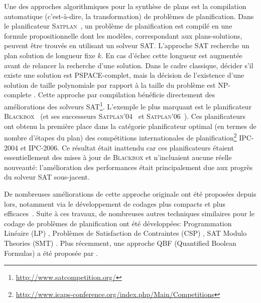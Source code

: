 Une des approches algorithmiques pour la synthèse de plans est la compilation automatique (c'est-à-dire, la transformation) de problèmes de planification. Dans le planificateur \textsc{Satplan}~\cite{KS92}, un problème de planification est compilé en une formule propositionnelle dont les modèles, correspondant aux plans-solutions, peuvent être trouvés en utilisant un solveur SAT.
L'approche SAT recherche un plan solution de longueur fixe $k$. En cas d'échec cette longueur est augmentée avant de relancer la recherche d'une solution. Dans le cadre classique, décider s'il existe une solution est PSPACE-complet, mais la décision de l'existence d'une solution de taille polynomiale par rapport à la taille du problème est NP-complete \cite{DBLP:journals/ai/Bylander94}.
Cette approche par compilation bénéficie directement des améliorations des solveurs SAT\footnote{\url{http://www.satcompetition.org/}}. L'exemple le plus marquant est le planificateur \textsc{Blackbox}~\cite{KS98a,KS99} (et ses successeurs \textsc{Satplan}'04~\cite{KAU04} et \textsc{Satplan}'06~\cite{KSH06}). Ces planificateurs ont obtenu la première place dans la catégorie planificateur optimal (en termes de nombre d'étapes du plan) des compétitions internationales de planification\footnote{\url{http://www.icaps-conference.org/index.php/Main/Competitions}} IPC-2004 et IPC-2006. Ce résultat était inattendu car ces planificateurs étaient essentiellement des mises à jour de \textsc{Blackbox} et n'incluaient aucune réelle nouveauté: l'amélioration des performances était principalement due aux progrès du solveur SAT sous-jacent.



De nombreuses améliorations de cette approche originale ont été proposées depuis lors, notamment via le développement de codages plus compacts et plus efficaces~\cite{KS96,EMW97,MK98a,MK99,RIN03,RHN04,RHN06,DBLP:conf/aips/2008}. %
Suite à ces travaux, de nombreuses autres techniques similaires pour le codage de problèmes de planification ont été développées: Programmation Linéaire (LP) \cite{DBLP:conf/ijcai/WolfmanW99}, Problèmes de Satisfaction de Contraintes (CSP) \cite{DBLP:journals/ai/DoK01}, SAT Modulo Theories (SMT) \cite{DBLP:journals/ai/ShinD05,DBLP:conf/ictai/MarisR08,DBLP:conf/aaai/Rintanen15}. Plus récemment, une approche QBF (Quantified Boolean Formulas) a été proposée par \cite{DBLP:conf/aaai/Rintanen07,DBLP:conf/ecai/CashmoreFG12}.



